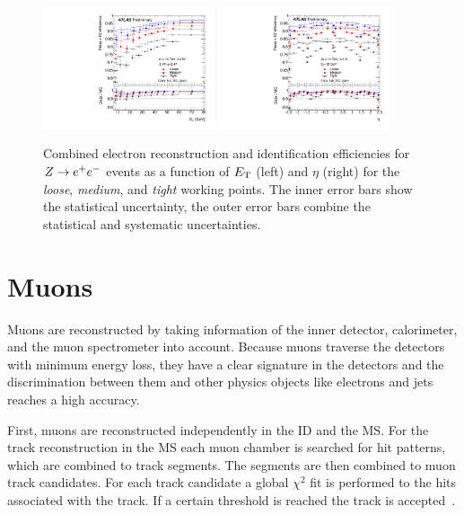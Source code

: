 \begin{figure}
    \centering
    \includegraphics[width=0.45\textwidth]{./figures/object_selection/electron_efficiency_et.pdf}
    \includegraphics[width=0.45\textwidth]{./figures/object_selection/electron_efficiency_eta.pdf}
    \caption{Combined electron reconstruction and identification efficiencies for $Z \to e^+e^-$ events as a
             function of $E_\text{T}$ (left) and $\eta$ (right) for the \emph{loose}, \emph{medium}, and \emph{tight}
             working points. The inner error bars show the statistical uncertainty, the outer error bars combine
             the statistical and systematic uncertainties.~\cite{ATLAS-CONF-2016-024}}\label{fig:object_selection:el_id_eff}
\end{figure}

\section{Muons}\label{sec:object_selection:muons}

Muons are reconstructed by taking information of the inner detector, calorimeter, and the
muon spectrometer into account.
Because  muons traverse the detectors with minimum energy loss, they have a clear signature in the detectors and the
discrimination between them and other physics objects like electrons and jets reaches a high accuracy.

First, muons are reconstructed independently in the ID and the MS\@.
For the track reconstruction in the MS each muon chamber is searched for hit patterns, which are combined to track
segments. The segments are then combined to muon track candidates. For each track candidate a global $\chi^2$ fit
is performed to the hits associated with the track. If a certain threshold is reached the track is accepted~\cite{PERF-2015-10}.

